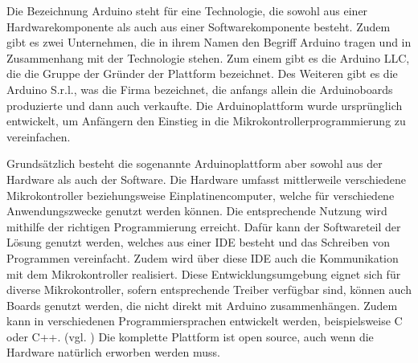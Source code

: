 Die Bezeichnung Arduino steht für eine Technologie, die sowohl aus einer Hardwarekomponente als auch aus einer Softwarekomponente besteht. Zudem gibt es zwei Unternehmen, die in ihrem Namen den Begriff Arduino tragen und in Zusammenhang mit der Technologie stehen. Zum einem gibt es die Arduino LLC, die die Gruppe der Gründer der Plattform bezeichnet. Des Weiteren gibt es die Arduino S.r.l., was die Firma bezeichnet, die anfangs allein die Arduinoboards produzierte und dann auch verkaufte. Die Arduinoplattform wurde ursprünglich entwickelt, um Anfängern den Einstieg in die Mikrokontrollerprogrammierung zu vereinfachen. 

Grundsätzlich besteht die sogenannte Arduinoplattform aber sowohl aus der Hardware als auch der Software. Die Hardware umfasst mittlerweile verschiedene Mikrokontroller beziehungsweise Einplatinencomputer, welche für verschiedene Anwendungszwecke genutzt werden können. Die entsprechende Nutzung wird mithilfe der richtigen Programmierung erreicht. Dafür kann der Softwareteil der Lösung genutzt werden, welches aus einer \ac{IDE}  besteht und das Schreiben von Programmen vereinfacht. Zudem wird über diese \ac{IDE} auch die Kommunikation mit dem Mikrokontroller realisiert. Diese Entwicklungsumgebung eignet sich für diverse Mikrokontroller, sofern entsprechende Treiber verfügbar sind, können auch Boards genutzt werden, die nicht direkt mit Arduino zusammenhängen. Zudem kann in verschiedenen Programmiersprachen entwickelt werden, beispielsweise C oder C++. (vgl. \cite{.h,.f,.e,.i,.g,online.})
Die komplette Plattform ist open source, auch wenn die Hardware natürlich erworben werden muss. 